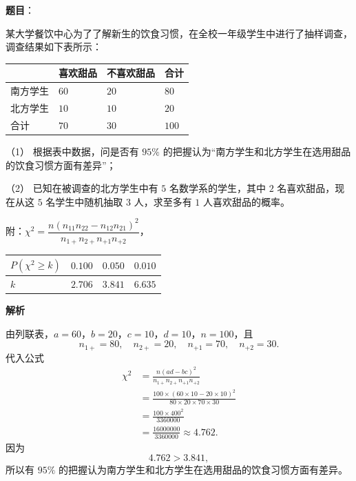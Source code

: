 \begin{answer}

\textbf{题目}：

某大学餐饮中心为了了解新生的饮食习惯，在全校一年级学生中进行了抽样调查，调查结果如下表所示：

\begin{center}
\begin{tabular}{llll}
\toprule
 & 喜欢甜品 & 不喜欢甜品 & 合计 \\
\midrule
南方学生 & $60$ & $20$ & $80$ \\
北方学生 & $10$ & $10$ & $20$ \\
合计 & $70$ & $30$ & $100$ \\
\bottomrule
\end{tabular}
\end{center}

（1） 根据表中数据，问是否有 $95\%$ 的把握认为“南方学生和北方学生在选用甜品的饮食习惯方面有差异”；

（2） 已知在被调查的北方学生中有 $5$ 名数学系的学生，其中 $2$ 名喜欢甜品，现在从这 $5$ 名学生中随机抽取 $3$ 人，求至多有 $1$ 人喜欢甜品的概率。

附：$\chi^2=\dfrac{n(n_{11}n_{22}-n_{12}n_{21})^2}{n_{1+}n_{2+}n_{+1}n_{+2}}$，

\begin{center}
\begin{tabular}{llll}
\toprule
$P(\chi^2\geqslant k)$ & $0.100$ & $0.050$ & $0.010$ \\
\midrule
$k$ & $2.706$ & $3.841$ & $6.635$ \\
\bottomrule
\end{tabular}
\end{center}

\textbf{解析}


由列联表，$a=60$，$b=20$，$c=10$，$d=10$，$n=100$，且
\nopagebreak[4]
\[n_{1+}=80,\quad n_{2+}=20,\quad n_{+1}=70,\quad n_{+2}=30.\]
代入公式
\nopagebreak[4]
\[\begin{aligned}
\chi^2&=\frac{n(ad-bc)^2}{n_{1+}n_{2+}n_{+1}n_{+2}}\\
&=\frac{100\times(60\times10-20\times10)^2}{80\times20\times70\times30}\\
&=\frac{100\times400^2}{3360000}\\
&=\frac{16000000}{3360000}\approx4.762.
\end{aligned}\]
因为
\nopagebreak[4]
\[4.762>3.841,\]
所以有 $95\%$ 的把握认为南方学生和北方学生在选用甜品的饮食习惯方面有差异。


\end{answer}
